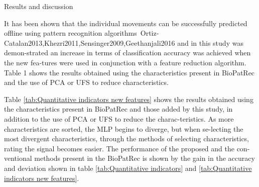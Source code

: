 \documentclass[a4paper, 12pt]{ppgeb}
\makeatletter
\renewcommand{\section}{\@startsection
{section}
{1}
{0mm}
{-\baselineskip}
{0.5\baselineskip}
{\large\bfseries\scshape}}
\makeatother
\begin{document}
\section{Results and discussion}

It has been shown that the individual movements can be successfully predicted offline using pattern recognition algorithms~\cite{mainreferences}{Ortiz-Catalan2013,Khezri2011,Sensinger2009,Geethanjali2016} and in this study was demon-strated an increase in terms of classification accuracy was achieved when the new fea-tures were used in conjunction with a feature reduction algorithm. Table 1 shows the results obtained using the characteristics present in BioPatRec and the use of \ac{PCA} or \ac{UFS} to reduce characteristics.

\begin{table}[h]
\centering
\caption{Quantitative indicators obtained with the comparison between old features with feature reduction algorithms.}\label{tab:Quantitative indicators}
\end{table}

Table \ref{tab:Quantitative indicators new features} shows the results obtained using the characteristics present in BioPatRec and those added by this study, in addition to the use of \ac{PCA} or \ac{UFS} to reduce the charac-teristics. As more characteristics are sorted, the MLP begins to diverge, but when se-lecting the most divergent characteristics, through the methods of selecting characteristics, rating the signal becomes easier. The performance of the proposed and the con-ventional methods present in the BioPatRec is shown by the gain in the accuracy and deviation shown in table \ref{tab:Quantitative indicators} and \ref{tab:Quantitative indicators new features}.
\end{document}
